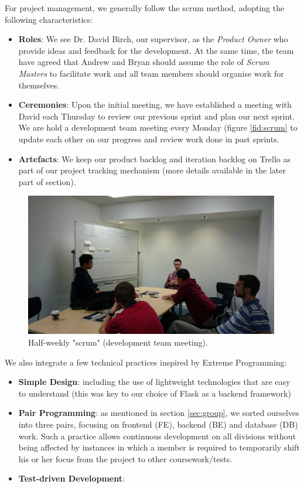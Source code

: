 \documentclass[a4paper]{article}
\begin{document}
For project management, we generally follow the scrum method, adopting the
following characteristics:
\begin{itemize}
  \item \textbf{Roles}: We see Dr. David Birch, our supervisor, as the \textit{Product Owner}
        who provide ideas and feedback for the development. At the same time,
        the team have agreed that Andrew and Bryan should assume the role of
        \textit{Scrum Masters} to facilitate work and all team members should organise
        work for themselves.
  \item \textbf{Ceremonies}: Upon the initial meeting, we have established a
        meeting with David each Thursday to review our previous sprint 
        and plan our next sprint. We are hold a development team
        meeting every Monday (figure \ref{fid:scrum} to update each other 
        on our progress and review work done in past sprints.
  \item \textbf{Artefacts}: We keep our product backlog and iteration backlog on
        Trello as part of our project tracking mechanism (more details
        available in the later part of section).
\end{itemize}


\begin{figure}[ht]
  \centering
    \includegraphics[width = 0.99\textwidth]{./planning/scrum.jpg}
   
  \caption{Half-weekly "scrum" (development team meeting).}
  \label{fig:scrum}
\end{figure}

We also integrate a few technical practices inspired by Extreme Programming:
\begin{itemize}
  \item \textbf{Simple Design}: including the use of lightweight technologies that are easy to understand (this was key to our choice of Flask as a backend framework)
  \item \textbf{Pair Programming}: as mentioned in section \ref{sec:group}, we sorted
        ourselves into three pairs, focusing on frontend (FE), backend (BE) and database (DB) work.
        Such a practice allows continuous development on all divisions without
        being affected by instances in which a member is required to temporarily shift his or her
        focus from the project to other coursework/tests.
  \item \textbf{Test-driven Development}: %

\end{itemize} 
\end{document}
